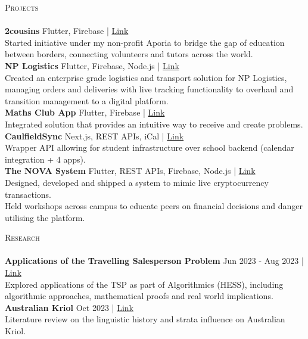 \documentclass[a4paper]{article}
\newcommand{\lineunder} {
    \vspace*{-8pt} \\
    \hspace*{-18pt} \hrulefill \\
}
\newcommand{\header} [1] {
    {\hspace*{-18pt}\vspace*{6pt} \textsc{#1}}
    \vspace*{-6pt} \lineunder
}
\begin{document}
\header{Projects}
{\textbf{2cousins}} {\textsl{\hfill} Flutter, Firebase | \href{https://2cousins.org/}{\color{blue}Link}}\\
Started initiative under my non-profit Aporia to bridge the gap of education between borders, connecting volunteers and tutors across the world.\\
\vspace*{2mm}
{\textbf{NP Logistics}} {\textsl{\hfill} Flutter, Firebase, Node.js} | \href{https://nplogistics.com.au}{\color{blue}Link}\\
Created an enterprise grade logistics and transport solution for NP Logistics, managing orders and deliveries with live tracking functionality to overhaul and transition management to a digital platform.\\
\vspace*{2mm}
{\textbf{Maths Club App}} {\textsl{\hfill} Flutter, Firebase} | \href{https://github.com/cgs-math/app}{\color{blue}Link}\\
Integrated solution that provides an intuitive way to receive and create problems.\\
\vspace*{2mm}
{\textbf{CaulfieldSync}} {\textsl{\hfill} Next.js, REST APIs, iCal} | \href{https://caulfieldsync.vercel.app/}{\color{blue}Link}\\
Wrapper API allowing for student infrastructure over school backend (calendar integration + 4 apps).\\
\vspace*{2mm}
{\textbf{The NOVA System}} {\textsl{\hfill} Flutter, REST APIs, Firebase, Node.js} | \href{https://the-nova-system.github.io/}{\color{blue}Link}\\
Designed, developed and shipped a system to mimic live cryptocurrency transactions.\\
Held workshops across campus to educate peers on financial decisions and danger utilising the platform.\\

\header{Research}
\textbf{Applications of the Travelling Salesperson Problem} \hfill Jun 2023 - Aug 2023 | \href{https://garv-shah.github.io/applications_of_tsp.pdf}{\color{blue}Link}\\
Explored applications of the TSP as part of Algorithmics (HESS), including algorithmic approaches, mathematical proofs and real world implications. \\
\vspace*{2mm}
\textbf{Australian Kriol} \hfill Oct 2023 | \href{https://garv-shah.github.io/australian_kriol.pdf}{\color{blue}Link}\\
Literature review on the linguistic history and strata influence on Australian Kriol.\\
\vspace*{2mm}
\end{document}
